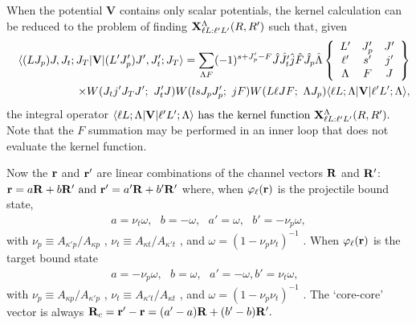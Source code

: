 \documentclass[11pt,a4paper]{article}
\newcommand{\vecr}{{\bf r}}
\newcommand{\vecR}{{\bf R}}
\begin{document}
When the potential {\bf V} contains only scalar potentials, the
kernel calculation can be reduced to the problem of finding
${\bf X}^\Lambda_{\ell L: \ell' L'} (R,R' ) $
such that, given
\begin{eqnarray}
&&\langle (LJ_p)J,J_t ;J_T | {\bf V}|(L' J'_ p)J' ,J'_ t ;J_T\rangle=\sum_{\Lambda F}
(-1)^{s+J'_ p - F} \hat J \hat {J'_ t} \hat j \hat F \hat {J_p} \hat \Lambda
\left \{ \begin{array}{ccc}L'&J'_p&J'\\ \ell'&s'&j'\\ \Lambda&F&J\end{array} \right \} \nonumber \\
 && \times W(J_t j' J_T J' ;~ J'_ t J)
             W(ls J_p J'_ p ;~jF)
             W(L \ell  J F;~ \Lambda J_p )
            \langle \ell L; \Lambda | {\bf V} | \ell' L' ; \Lambda\rangle  ,
        \label{Vtransf}
\end{eqnarray}
the integral operator
$
\langle \ell L; \Lambda | {\bf V} | \ell' L' ; \Lambda\rangle
\mbox{ has the kernel function }
 {\bf X}^\Lambda_{\ell L: \ell' L'} (R,R' ).
$
Note that the $F$ summation may be performed in an inner loop that does
not evaluate the kernel function.

Now the $\vecr$ and $\vecr'$ are linear combinations of the channel vectors
$\vecR$ and $\vecR'$:
$ \vecr = a \vecR + b \vecR' \mbox{ and } \vecr' = a' \vecR + b' \vecR' $
where,
when $ \varphi_\ell (\vecr) $ is the projectile bound state,
\begin{eqnarray}
a = \nu_t \omega , ~~~ b = - \omega , ~~~ a' = \omega , ~~~
b' = - \nu_p \omega ,
\end{eqnarray}
with
$ \nu_p \equiv A_{\kappa' p} / A_{\kappa p}$ ,
 $\nu_t \equiv A_{\kappa t} / A_{\kappa' t}$ ,
  and $ \omega = (1 - \nu_p \nu_t ) ^ {-1}$ .
When $ \varphi_\ell (\vecr) $ is the target bound state
\begin{eqnarray}
a = - \nu_p \omega, ~~~ b = \omega , ~~~ a' = - \omega ,
b' = \nu_t \omega
, ~~~
\end{eqnarray}
with
$\nu_p \equiv A_{\kappa p} / A_{\kappa' p}$ ,
$\nu_t \equiv A_{\kappa' t} / A_{\kappa t}$ ,
  and $ \omega = (1 - \nu_p \nu_t ) ^ {-1}$ .
The `core-core' vector is always $ \vecR_c = \vecr' - \vecr
 = (a' - a) \vecR + (b' - b) \vecR' . $
\end{document}
